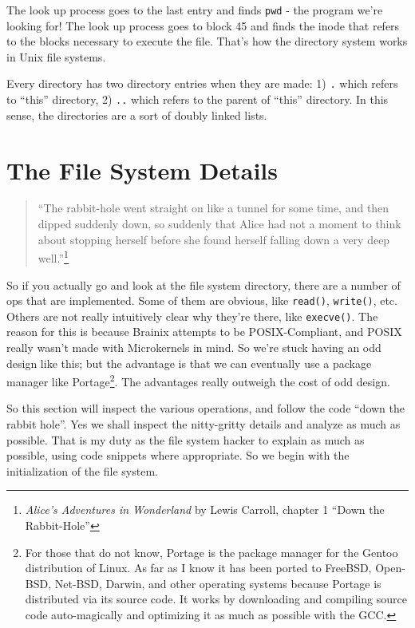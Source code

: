 The look up process goes to the last entry and finds \verb|pwd| - the program we're looking for! The look up process goes to block 45 and finds the inode that refers to the blocks necessary to execute the file. That's how the directory system works in Unix file systems.

Every directory has two directory entries when they are made: 1) \verb|.| which refers to ``this'' directory, 2) \verb|..| which refers to the parent of ``this'' directory. In this sense, the directories are a sort of doubly linked lists.

\section{The File System Details}

\begin{quote}
``The rabbit-hole went straight on like a tunnel for some time, and then dipped suddenly down, so suddenly that Alice had not a moment to think about stopping herself before she found herself falling down a very deep well.''\footnote{\textit{Alice's Adventures in Wonderland} by Lewis Carroll, chapter 1 ``Down the Rabbit-Hole''}
\end{quote}

So if you actually go and look at the file system directory, there are a number of ops that are implemented. Some of them are obvious, like \verb|read()|, \verb|write()|, etc. Others are not really intuitively clear why they're there, like \verb|execve()|. The reason for this is because Brainix attempts to be POSIX-Compliant, and POSIX really wasn't made with Microkernels in mind. So we're stuck having an odd design like this; but the advantage is that we can eventually use a package manager like Portage\footnote{For those that do not know, Portage is the package manager for the Gentoo distribution of Linux. As far as I know it has been ported to FreeBSD, Open-BSD, Net-BSD, Darwin, and other operating systems because Portage is distributed via its source code. It works by downloading and compiling source code auto-magically and optimizing it as much as possible with the GCC.}. The advantages really outweigh the cost of odd design.

So this section will inspect the various operations, and follow the code ``down the rabbit hole''. Yes we shall inspect the nitty-gritty details and analyze as much as possible. That is my duty as the file system hacker to explain as much as possible, using code snippets where appropriate. So we begin with the initialization of the file system.


